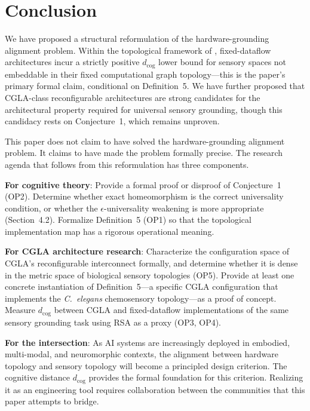 \documentclass[12pt]{article}
\begin{document}
\section{Conclusion}

We have proposed a structural reformulation of the hardware-grounding
alignment problem. Within the topological framework of
\cite{minamoto2026topology}, fixed-dataflow architectures incur a strictly
positive $d_{\mathrm{cog}}$ lower bound for sensory spaces not
embeddable in their fixed computational graph topology---this is the
paper's primary formal claim, conditional on Definition~5. We have
further proposed that CGLA-class reconfigurable architectures are
strong candidates for the architectural property required for
universal sensory grounding, though this candidacy rests on
Conjecture~1, which remains unproven.

This paper does not claim to have solved the hardware-grounding
alignment problem. It claims to have made the problem formally
precise. The research agenda that follows from this reformulation
has three components.

\textbf{For cognitive theory}: Provide a formal proof or disproof
of Conjecture~1 (OP2). Determine whether exact homeomorphism is the
correct universality condition, or whether the $\epsilon$-universality
weakening is more appropriate (Section~4.2). Formalize Definition~5
(OP1) so that the topological implementation map has a rigorous
operational meaning.

\textbf{For CGLA architecture research}: Characterize the
configuration space of CGLA's reconfigurable interconnect formally,
and determine whether it is dense in the metric space of biological
sensory topologies (OP5). Provide at least one concrete instantiation
of Definition~5---a specific CGLA configuration that implements the
\textit{C.~elegans} chemosensory topology---as a proof of concept.
Measure $d_{\mathrm{cog}}$ between CGLA and fixed-dataflow
implementations of the same sensory grounding task using RSA as
a proxy (OP3, OP4).

\textbf{For the intersection}: As AI systems are increasingly
deployed in embodied, multi-modal, and neuromorphic contexts, the
alignment between hardware topology and sensory topology will become
a principled design criterion. The cognitive distance $d_{\mathrm{cog}}$
provides the formal foundation for this criterion. Realizing it as
an engineering tool requires collaboration between the communities
that this paper attempts to bridge.
\end{document}
